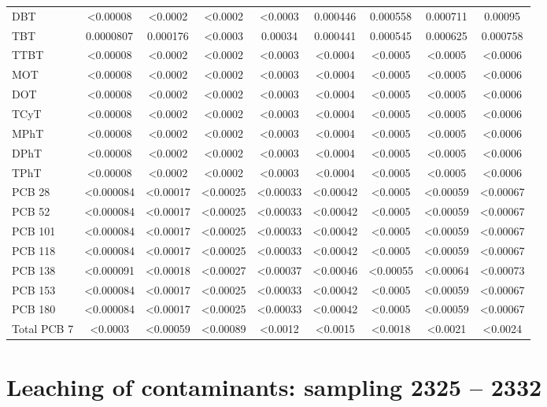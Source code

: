 \documentclass[algorithms,article,submit,pdftex,moreauthors]{Definitions/mdpi}
\begin{document}
\begin{scriptsize}
\begin{center}
\begin{longtable}{@{\extracolsep{\fill}}|p{1.8cm}|cccccccc|@{}}
DBT & <0.00008 & <0.0002 & <0.0002 & <0.0003 & 0.000446 & 0.000558 & 0.000711 & 0.00095 \\
TBT & 0.0000807 & 0.000176 & <0.0003 & 0.00034 & 0.000441 & 0.000545 & 0.000625 & 0.000758 \\
TTBT & <0.00008 & <0.0002 & <0.0002 & <0.0003 & <0.0004 & <0.0005 &<0.0005 & <0.0006 \\
MOT & <0.00008 & <0.0002 & <0.0002 & <0.0003 & <0.0004 & <0.0005 &<0.0005 & <0.0006 \\
DOT & <0.00008 & <0.0002 & <0.0002 & <0.0003 & <0.0004 & <0.0005 &<0.0005 & <0.0006 \\
TCyT & <0.00008 & <0.0002 & <0.0002 & <0.0003 & <0.0004 & <0.0005 &<0.0005 & <0.0006 \\
MPhT & <0.00008 & <0.0002 & <0.0002 & <0.0003 & <0.0004 & <0.0005 &<0.0005 & <0.0006 \\
DPhT & <0.00008 & <0.0002 & <0.0002 & <0.0003 & <0.0004 & <0.0005 &<0.0005 & <0.0006 \\
TPhT & <0.00008 & <0.0002 & <0.0002 & <0.0003 & <0.0004 & <0.0005 &<0.0005 & <0.0006 \\
PCB 28 & <0.000084 & <0.00017 & <0.00025 & <0.00033 & <0.00042 & <0.0005 & <0.00059 & <0.00067 \\
PCB 52 & <0.000084 & <0.00017 & <0.00025 & <0.00033 & <0.00042 & <0.0005 & <0.00059 & <0.00067 \\
PCB 101 & <0.000084 & <0.00017 & <0.00025 & <0.00033 & <0.00042 & <0.0005 & <0.00059 & <0.00067 \\
PCB 118 & <0.000084 & <0.00017 & <0.00025 & <0.00033 & <0.00042 & <0.0005 & <0.00059 & <0.00067 \\
PCB 138 & <0.000091 & <0.00018 & <0.00027 & <0.00037 & <0.00046 & <0.00055 & <0.00064 & <0.00073 \\
PCB 153 & <0.000084 & <0.00017 & <0.00025 & <0.00033 & <0.00042 & <0.0005 & <0.00059 & <0.00067 \\
PCB 180 & <0.000084 & <0.00017 & <0.00025 & <0.00033 & <0.00042 & <0.0005 & <0.00059 & <0.00067 \\
Total PCB 7 & <0.0003 & <0.00059 & <0.00089 & <0.0012 & <0.0015 & <0.0018 & <0.0021 & <0.0024 \\
%
\end{longtable}
\end{center}
\end{scriptsize}

\section[\appendixname~\thesection]{Leaching of contaminants: sampling 2325 -- 2332}
\end{document}

